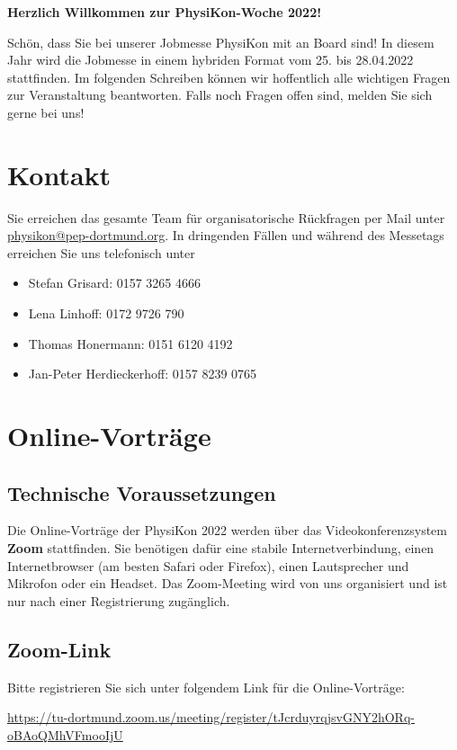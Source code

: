 \documentclass[
  paper=a4,
  fontsize=12pt,
  DIV=16,
  headheight=30pt,
  footheight=45pt,
  headinclude,
  parskip=half,
]{scrartcl}
\begin{document}
\textbf{\Large Herzlich Willkommen zur PhysiKon-Woche 2022!}

\vspace{1cm}
Schön, dass Sie bei unserer Jobmesse PhysiKon mit an Board sind!
In diesem Jahr wird die Jobmesse in einem hybriden Format vom 25. bis 28.04.2022 stattfinden.
Im folgenden Schreiben können wir hoffentlich alle wichtigen Fragen zur Veranstaltung beantworten.
Falls noch Fragen offen sind, melden Sie sich gerne bei uns!

\section*{Kontakt}

Sie erreichen das gesamte Team für organisatorische Rückfragen per Mail unter \href{mailto:physikon@pep-dortmund.org}{physikon@pep-dortmund.org}.
In dringenden Fällen und während des Messetags erreichen Sie uns telefonisch unter
\begin{itemize}
  \item Stefan Grisard: 0157 3265 4666
  \item Lena Linhoff: 0172 9726 790
  \item Thomas Honermann: 0151 6120 4192
  \item Jan-Peter Herdieckerhoff: 0157 8239 0765
\end{itemize}

\section*{Online-Vorträge}
\subsection*{Technische Voraussetzungen}

Die Online-Vorträge der PhysiKon 2022 werden über das Videokonferenzsystem \textbf{Zoom} stattfinden.
Sie benötigen dafür eine stabile Internetverbindung, einen Internetbrowser (am besten Safari oder Firefox), einen Lautsprecher und Mikrofon oder ein Headset.
Das Zoom-Meeting wird von uns organisiert und ist nur nach einer Registrierung zugänglich.

\subsection*{Zoom-Link}
Bitte registrieren Sie sich unter folgendem Link für die Online-Vorträge:

\url{https://tu-dortmund.zoom.us/meeting/register/tJcrduyrqjsvGNY2hORq-oBAoQMhVFmooIjU}
\end{document}

